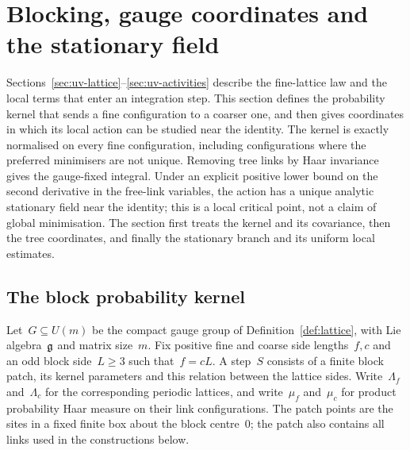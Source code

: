 \section{Blocking, gauge coordinates and the stationary field}\label{sec:uv-blocking}

Sections~\ref{sec:uv-lattice}--\ref{sec:uv-activities} describe the fine-lattice law and the local terms that enter an integration step. This section defines the probability kernel that sends a fine configuration to a coarser one, and then gives coordinates in which its local action can be studied near the identity. The kernel is exactly normalised on every fine configuration, including configurations where the preferred minimisers are not unique. Removing tree links by Haar invariance gives the gauge-fixed integral. Under an explicit positive lower bound on the second derivative in the free-link variables, the action has a unique analytic stationary field near the identity; this is a local critical point, not a claim of global minimisation. The section first treats the kernel and its covariance, then the tree coordinates, and finally the stationary branch and its uniform local estimates.

\subsection{The block probability kernel}\label{subsec:uv-block-kernel}

Let~$G\subseteq U(m)$ be the compact gauge group of Definition~\ref{def:lattice}, with Lie algebra~$\mathfrak g$ and matrix size~$m$. Fix positive fine and coarse side lengths~$f,c$ and an odd block side~$L\ge3$ such that~$f=cL$. A step~$S$ consists of a finite block patch, its kernel parameters and this relation between the lattice sides. Write~$\Lambda_f$ and~$\Lambda_c$ for the corresponding periodic lattices, and write~$\mu_f$ and~$\mu_c$ for product probability Haar measure on their link configurations. The patch points are the sites in a fixed finite box about the block centre~$0$; the patch also contains all links used in the constructions below.

